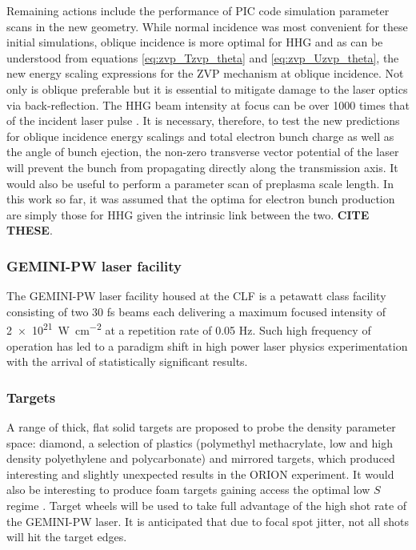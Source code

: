 Remaining actions include the performance of PIC code simulation parameter scans in the new geometry. While normal incidence was most convenient for these initial simulations, oblique incidence is more optimal for \ac{HHG} \cite{gonoskovUltrarelativisticNanoplasmonicsRoute2011, edwardsXRayEmissionEffectiveness2020} and as can be understood from equations \ref{eq:zvp_Tzvp_theta} and \ref{eq:zvp_Uzvp_theta}, the new energy scaling expressions for the ZVP mechanism at oblique incidence. Not only is oblique preferable but it is essential to mitigate damage to the laser optics via back-reflection. The \ac{HHG} beam intensity at focus can be over 1000 times that of the incident laser pulse \cite{quereReflectingPetawattLasers2021}. It is necessary, therefore, to test the new predictions for oblique incidence energy scalings and total electron bunch charge as well as the angle of bunch ejection, the non-zero transverse vector potential of the laser will prevent the bunch from propagating directly along the transmission axis. It would also be useful to perform a parameter scan of preplasma scale length. In this work so far, it was assumed that the optima for electron bunch production are simply those for \ac{HHG} given the intrinsic link between the two. \textbf{CITE THESE}. 

\subsubsection{GEMINI-PW laser facility}
The GEMINI-PW laser facility housed at the \ac{CLF} is a petawatt class facility consisting of two 30 fs beams each delivering a maximum focused intensity of \qty{2e21}{W.cm^{-2}} at a repetition rate of 0.05 Hz. Such high frequency of operation has led to a paradigm shift in high power laser physics experimentation with the arrival of statistically significant results.


\subsubsection{Targets}
A range of thick, flat solid targets are proposed to probe the density parameter space: diamond, a selection of plastics (polymethyl methacrylate, low and high density polyethylene and polycarbonate) and mirrored targets, which produced interesting and slightly unexpected results in the ORION experiment. It would also be interesting to produce foam targets gaining access the optimal low $S$ regime \cite{bataniPhysicsIssuesShock2014}. Target wheels will be used to take full advantage of the high shot rate of the GEMINI-PW laser. It is anticipated that due to focal spot jitter, not all shots will hit the target edges. 

